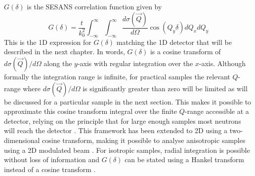 \documentclass{article}
\begin{document}
$G(\delta)$ is the SESANS correlation function given by
\begin{equation}
	G(\delta) = \frac{t}{k_0^2}\int_{-\infty}^\infty\int_{-\infty}^\infty\dfrac{d\sigma(\vec{Q})}{d\Omega}\cos(Q_y \delta)dQ_xdQ_y  \label{eq:G-analytical}
\end{equation}
This is the 1D expression for $G(\delta)$ matching the 1D detector that will be described in the next chapter. In words, $G(\delta)$ is a cosine transform of $d\sigma(\vec{Q})/d\Omega$ \cite{li2019} along the $y$-axis with regular integration over the $x$-axis. Although formally the integration range is infinite, for practical samples the relevant $Q$-range where $d\sigma(\vec{Q})/d\Omega$ is significantly greater than zero will be limited as will be discussed for a particular sample in the next section. This makes it possible to approximate this cosine transform integral over the finite $Q$-range accessible at a detector, relying on the principle that for large enough samples most neutrons will reach the detector \cite{rekveldt1996}. This framework has been extended to 2D using a two-dimensional cosine transform, making it possible to analyse anisotropic samples using a 2D modulated beam \cite{parnell2023}.
For isotropic samples, radial integration is possible without loss of information and $G(\delta)$ can be stated using a Hankel transform instead of a cosine transform \cite{andersson2008}.
\end{document}
